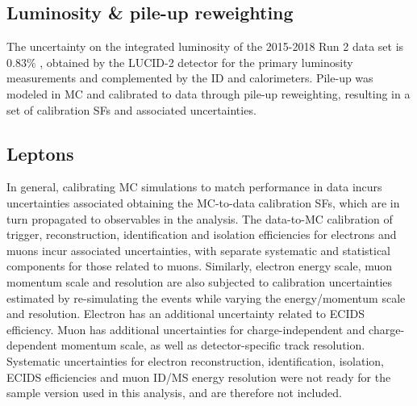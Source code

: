 \documentclass[../thesis.tex]{subfiles}
\begin{document}
\begin{table}[!htbp]
{\begin{tabular}{lc}
      \bottomrule
    \end{tabular}
}
\end{table}

\subsection{Luminosity \& pile-up reweighting}
The uncertainty on the integrated luminosity of the 2015-2018 Run 2 data set is $0.83\%$ \citep{DAPR-2021-01}, obtained by the LUCID-2 detector \citep{LUCID2} for the primary luminosity measurements and complemented by the \acs{ID} and calorimeters. Pile-up was modeled in \acs{MC} and calibrated to data through pile-up reweighting, resulting in a set of calibration \acs{SF}s and associated uncertainties.

\subsection{Leptons}
In general, calibrating \acs{MC} simulations to match performance in data incurs uncertainties associated obtaining the MC-to-data calibration \acs{SF}s, which are in turn propagated to observables in the analysis. The data-to-\acs{MC} calibration of trigger, reconstruction, identification and isolation efficiencies for electrons and muons incur associated uncertainties, with separate systematic and statistical components for those related to muons. Similarly, electron energy scale, muon momentum scale and resolution are also subjected to calibration uncertainties estimated by re-simulating the events while varying the energy/momentum scale and resolution. Electron has an additional uncertainty related to \acs{ECIDS} efficiency. Muon has additional uncertainties for charge-independent and charge-dependent momentum scale, as well as detector-specific track resolution. Systematic uncertainties for electron reconstruction, identification, isolation, \acs{ECIDS} efficiencies and muon \acs{ID}/\acs{MS} energy resolution were not ready for the sample version used in this analysis, and are therefore not included.
\end{document}
